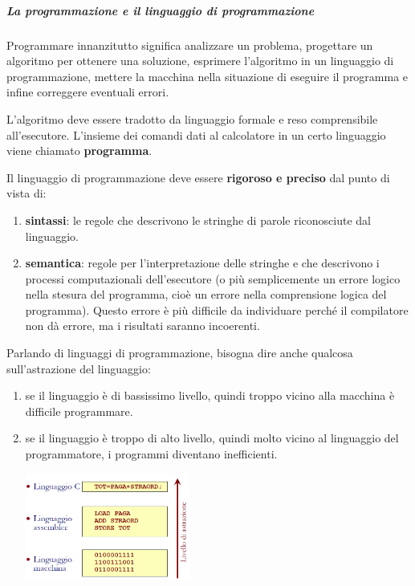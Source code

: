 \documentclass[
  paper=a4,
  oneside  ,captions=tableheading
]{scrbook}
\providecommand{\tightlist}{%
  \setlength{\itemsep}{0pt}\setlength{\parskip}{0pt}}
\begin{document}
\hypertarget{la-programmazione-e-il-linguaggio-di-programmazione}{%
\subparagraph{La programmazione e il linguaggio di
programmazione}\label{la-programmazione-e-il-linguaggio-di-programmazione}}

Programmare innanzitutto significa analizzare un problema, progettare un
algoritmo per ottenere una soluzione, esprimere l'algoritmo in un
linguaggio di programmazione, mettere la macchina nella situazione di
eseguire il programma e infine correggere eventuali errori.

L'algoritmo deve essere tradotto da linguaggio formale e reso
comprensibile all'esecutore. L'insieme dei comandi dati al calcolatore
in un certo linguaggio viene chiamato \textbf{programma}.

Il linguaggio di programmazione deve essere \textbf{rigoroso e preciso}
dal punto di vista di:

\begin{enumerate}
\def\labelenumi{\arabic{enumi}.}
\tightlist
\item
  \textbf{sintassi}: le regole che descrivono le stringhe di parole
  riconosciute dal linguaggio.
\item
  \textbf{semantica}: regole per l'interpretazione delle stringhe e che
  descrivono i processi computazionali dell'esecutore (o più
  semplicemente un errore logico nella stesura del programma, cioè un
  errore nella comprensione logica del programma). Questo errore è più
  difficile da individuare perché il compilatore non dà errore, ma i
  risultati saranno incoerenti.
\end{enumerate}

Parlando di linguaggi di programmazione, bisogna dire anche qualcosa
sull'astrazione del linguaggio:

\begin{enumerate}
\def\labelenumi{\arabic{enumi}.}
\item
  se il linguaggio è di bassissimo livello, quindi troppo vicino alla
  macchina è difficile programmare.
\item
  se il linguaggio è troppo di alto livello, quindi molto vicino al
  linguaggio del programmatore, i programmi diventano inefficienti.

    \includegraphics[height=3.5cm]{./image/image-20201111001022024.png}
\end{enumerate}
\end{document}
